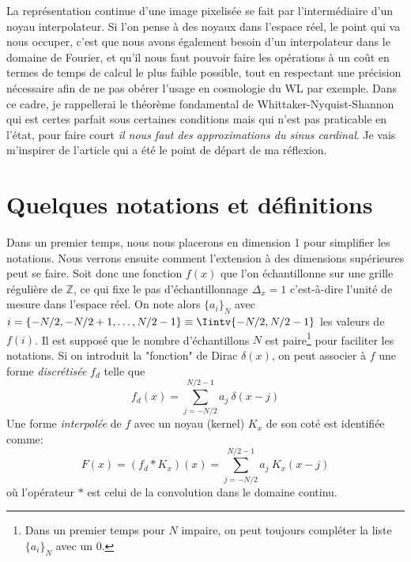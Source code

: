 \documentclass[11pt,twoside]{article}
\begin{document}
La représentation continue d'une image pixelisée se fait par l'intermédiaire d'un noyau interpolateur. Si l'on pense à des noyaux dans l'espace réel, le point qui va nous occuper, c'est que nous avons également besoin d'un interpolateur dans le domaine de Fourier, et qu'il nous faut pouvoir faire les opérations à un coût en termes de temps de calcul le plus faible possible, tout en respectant une précision nécessaire afin de ne pas obérer l'usage en cosmologie du WL par exemple. Dans ce cadre, je rappellerai le théorème fondamental de  Whittaker-Nyquist-Shannon qui est certes parfait sous certaines conditions mais qui n'est pas praticable en l'état, pour faire court \textit{il nous faut des approximations du sinus cardinal}. Je vais m'inspirer de l'article \cite{2014PASP..126..287B} qui a été le point de départ de ma réflexion. 
%
\section{Quelques notations et définitions}
\label{sec:Def}
%
Dans un premier temps, nous nous placerons en dimension 1 pour simplifier les notations. Nous verrons ensuite comment l'extension à des dimensions supérieures peut se faire. Soit donc une fonction $f(x)$ que l'on échantillonne sur une grille régulière de $\mathbb{Z}$, ce qui fixe le pas d'échantillonnage $\Delta_x=1$ c'est-à-dire l'unité de mesure dans l'espace réel. On note alors $\{a_i\}_N$ avec $i=\{-N/2,-N/2+1,\dots,N/2-1\}\equiv\Iintv{-N/2,N/2-1}$ les valeurs de $f(i)$. Il est supposé que le nombre d'échantillons $N$ est paire\footnote{Dans un premier temps pour $N$ impaire, on peut toujours compléter la liste  $\{a_i\}_N$ avec un 0.} pour faciliter les notations. Si on introduit la "fonction" de Dirac $\delta(x)$, on peut associer à $f$ une forme \textit{discrétisée} $f_d$ telle que
\begin{equation}
f_d(x) = \sum_{j=-N/2}^{N/2-1} a_j\ \delta(x-j)
\label{eq:fdreal}
\end{equation}
Une forme \textit{interpolée} de $f$ avec un noyau (kernel) $K_x$ de son coté est identifiée comme:
\begin{equation}
F(x) = (f_d \ast K_x)(x) = \sum_{j=-N/2}^{N/2-1} a_j\ K_x(x-j)
\label{eq:Freal}
\end{equation}
où l'opérateur $\ast$ est celui de la convolution dans le domaine continu. 
\end{document}
